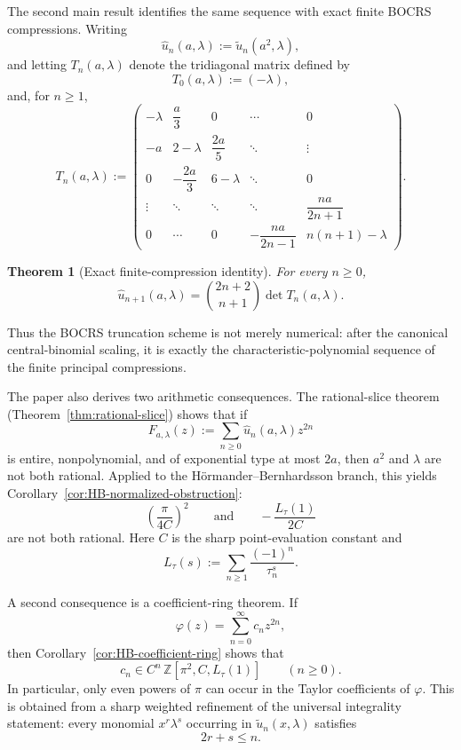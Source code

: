 \documentclass[11pt,letterpaper]{amsart}
\numberwithin{equation}{section}
\theoremstyle{plain}
\newtheorem{theorem}{Theorem}
\theoremstyle{remark}
\newcommand{\Z}{\mathbb{Z}}
\begin{document}
The second main result identifies the same sequence with exact finite BOCRS compressions. Writing
\[
\widehat u_n(a,\lambda):=\widetilde u_n(a^2,\lambda),
\]
and letting \(T_n(a,\lambda)\) denote the tridiagonal matrix defined by 
\[
T_0(a,\lambda):=(-\lambda),
\]
and, for \(n\ge 1\),
\begin{equation}
T_n(a,\lambda):=
\begin{pmatrix}
-\lambda & \dfrac{a}{3} & 0 & \cdots & 0 \\
-a & 2-\lambda & \dfrac{2a}{5} & \ddots & \vdots \\
0 & -\dfrac{2a}{3} & 6-\lambda & \ddots & 0 \\
\vdots & \ddots & \ddots & \ddots & \dfrac{na}{2n+1} \\
0 & \cdots & 0 & -\dfrac{na}{2n-1} & n(n+1)-\lambda
\end{pmatrix}.
\end{equation}

\begin{theorem}[Exact finite-compression identity]
For every \(n\ge 0\),
\[
\widehat u_{n+1}(a,\lambda)=\binom{2n+2}{n+1}\det T_n(a,\lambda).
\]
\end{theorem}

Thus the BOCRS truncation scheme is not merely numerical: after the canonical
central-binomial scaling, it is exactly the characteristic-polynomial sequence of the
finite principal compressions.

The paper also derives two arithmetic consequences. The rational-slice theorem
(Theorem~\ref{thm:rational-slice}) shows that if
\[
F_{a,\lambda}(z):=\sum_{n\ge0}\widehat u_n(a,\lambda)z^{2n}
\]
is entire, nonpolynomial, and of exponential type at most \(2a\), then \(a^2\) and
\(\lambda\) are not both rational. Applied to the H\"ormander--Bernhardsson branch, this yields
Corollary~\ref{cor:HB-normalized-obstruction}:
\[
\left(\frac{\pi}{4C}\right)^2
\qquad\text{and}\qquad
-\frac{L_\tau(1)}{2C}
\]
are not both rational. Here \(C\) is the sharp point-evaluation constant and
\[
L_\tau(s):=\sum_{n\ge1}\frac{(-1)^n}{\tau_n^s}.
\]

A second consequence is a coefficient-ring theorem. If
\[
\varphi(z)=\sum_{n=0}^{\infty}c_n z^{2n},
\]
then Corollary~\ref{cor:HB-coefficient-ring} shows that
\[
c_n\in C^n\,\Z[\pi^2,C,L_\tau(1)]
\qquad(n\ge0).
\]
In particular, only even powers of \(\pi\) can occur in the Taylor coefficients of
\(\varphi\). This is obtained from a sharp weighted refinement of the universal integrality
statement: every monomial \(x^r\lambda^s\) occurring in \(\widetilde u_n(x,\lambda)\)
satisfies
\[
2r+s\le n.
\]
\end{document}
